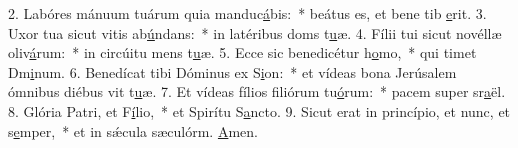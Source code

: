 2. Labóres mánuum tuárum quia manduc\uline{á}bis:~* beátus es, et bene tib \uline{e}rit.
3. Uxor tua sicut vitis ab\uline{ú}ndans:~* in latéribus doms t\uline{u}æ.
4. Fílii tui sicut novéllæ oliv\uline{á}rum:~* in circúitu mens t\uline{u}æ.
5. Ecce sic benedicétur h\uline{o}mo,~* qui timet Dm\uline{i}num.
6. Benedícat tibi Dóminus ex S\uline{i}on:~* et vídeas bona Jerúsalem ómnibus diébus vit t\uline{u}æ.
7. Et vídeas fílios filiórum tu\uline{ó}rum:~* pacem super sr\uline{a}ël.
8. Glória Patri, et F\uline{í}lio,~* et Spirítu S\uline{a}ncto.
9. Sicut erat in princípio, et nunc, et s\uline{e}mper,~* et in sǽcula sæculórm. \uline{A}men.
